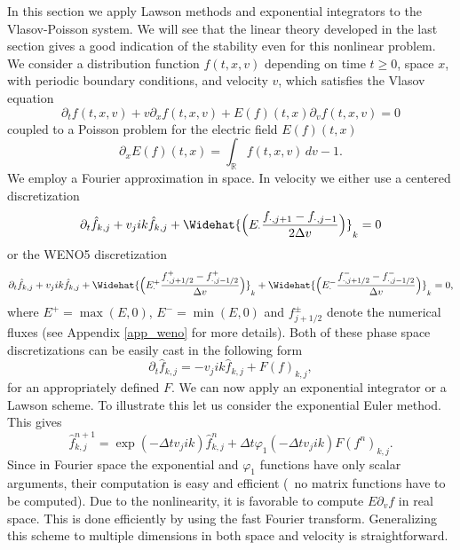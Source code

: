 In this section we apply Lawson methods and exponential integrators to the Vlasov-Poisson system. We will see that the linear theory developed in the last section gives a good indication of the stability even for this nonlinear problem. We consider a distribution function $f(t, x, v)$ depending on time $t\geq 0$, space $x$, with periodic boundary conditions, and velocity $v$, which satisfies the Vlasov equation 
\begin{equation}
	\label{vlasov}
    \partial_t f(t, x, v) + v\partial_x f(t, x, v) + E(f)(t, x)\partial_v f(t, x, v) = 0   
\end{equation}
coupled to a Poisson problem for the electric field $E(f)(t, x)$ 
\begin{equation}
    \partial_x  E(f)(t, x)= \int_{\mathbb{R}} f(t, x, v) \,dv -1. 
\end{equation}
We employ a Fourier approximation in space. In velocity we either use a centered discretization
$$
\partial_t \hat{f}_{k,j} + v_j i k \hat{f}_{k,j} + \Widehat{\Big(E_{\cdot} \frac{f_{\cdot,j+1}  -f_{\cdot,j-1}}{2\Delta v}\Big)}_k = 0
$$  
or the WENO5 discretization
\begin{equation}
    \displaystyle\partial_t \hat{f}_{k,j} + v_j ik \hat{f}_{k,j} + \Widehat{\Big(E^+_{\cdot} \frac{f^+_{\cdot,j+1/2} - f^+_{\cdot,j-1/2}}{\Delta v} \Big)}_k 
+ \Widehat{\Big(E^-_{\cdot} \frac{f^-_{\cdot,j+1/2} - f^-_{\cdot,j-1/2}}{\Delta v} \Big)}_k = 0, 
\label{vp_weno}
\end{equation} 
where $E^+=\max(E, 0)$, $E^-=\min(E, 0)$ and $f^\pm_{j+1/2}$ denote the numerical fluxes (see Appendix \ref{app_weno} for more details). Both of these phase space discretizations can be easily cast in the following form
\[ \partial_t \hat{f}_{k,j} = - v_j i k \hat{f}_{k,j} + F(f)_{k,j}, \]
for an appropriately defined $F$. We can now apply an exponential integrator or a Lawson scheme. To illustrate this let us consider the exponential Euler method. This gives
\[ \hat{f}^{n+1}_{k,j} = \exp(-\Delta t v_j i k) \hat{f}^n_{k,j} + \Delta t \varphi_1(-\Delta t v_j i k) F(f^n)_{k,j}. \]
Since in Fourier space the exponential and $\varphi_1$ functions have only scalar arguments, their computation is easy and efficient (\ie~no matrix functions have to be computed). Due to the nonlinearity, it is favorable to compute $E \partial_v f$ in real space. This is done efficiently by using the fast Fourier transform. Generalizing this scheme to multiple dimensions in both space and velocity is straightforward.


